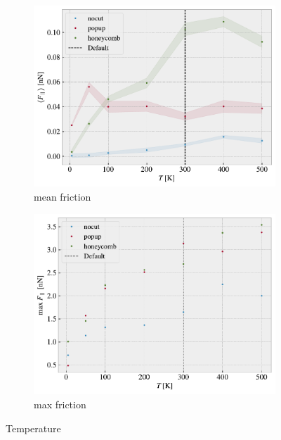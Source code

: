 \begin{figure}[H]
  \centering
  \begin{subfigure}[b]{0.49\textwidth}
      \centering
      \includegraphics[width=\textwidth]{figures/baseline/variables_temp_mean_fixmove.pdf}
      \caption{mean friction}
      \label{fig:var_temp_mean}
  \end{subfigure}
  \hfill
  \begin{subfigure}[b]{0.49\textwidth}
      \centering
      \includegraphics[width=\textwidth]{figures/baseline/variables_temp_max_fixmove.pdf}
      \caption{max friction}
      \label{fig:var_temp_max}
  \end{subfigure}
  \hfill
     \caption{Temperature}
     \label{fig:var_temp}
\end{figure}

